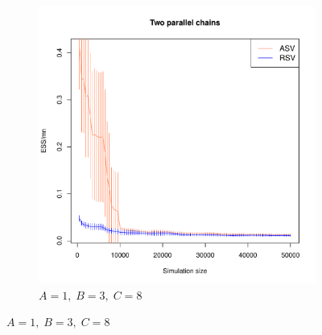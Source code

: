 \documentclass[11pt]{article}
\theoremstyle{remark}
\begin{document}
\begin{figure}[h]
    \centering
    
    \begin{subfigure}[h]{.3\textwidth}
      \centering
      \includegraphics[width = \textwidth]{plots/boom-ess1.pdf}
      \caption{$A = 1, \; B = 3, \; C = 8$}
      \label{subfig:boom-ess1}
    \end{subfigure}
    

\end{figure}
\end{document}
